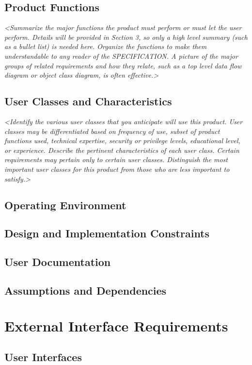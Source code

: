 \documentclass[english]{article}
\numberwithin{equation}{section} %
\begin{document}
\subsection{Product Functions}
\textit{<Summarize the major functions the product must perform or must let the user perform. Details will be provided in Section 3, so only a high level summary (such as a bullet list) is needed here. Organize the functions to make them understandable to any reader of the SPECIFICATION. A picture of the major groups of related requirements and how they relate, such as a top level data flow diagram or object class diagram, is often effective.>}

\subsection{User Classes and Characteristics}
\textit{<Identify the various user classes that you anticipate will use this product. User classes may be differentiated based on frequency of use, subset of product functions used, technical expertise, security or privilege levels, educational level, or experience. Describe the pertinent characteristics of each user class. Certain requirements may pertain only to certain user classes. Distinguish the most important user classes for this product from those who are less important to satisfy.>}

\subsection{Operating Environment}
\subsection{Design and Implementation Constraints}
\subsection{User Documentation}
\subsection{Assumptions and Dependencies}

\newpage
\section{External Interface Requirements}
\subsection{User Interfaces}
\end{document}
